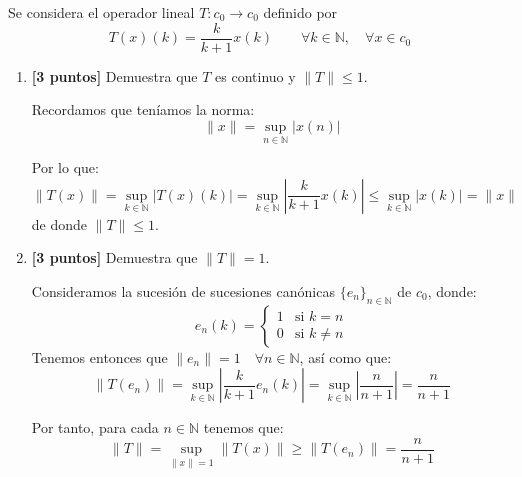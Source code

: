 \documentclass[12pt]{article}
\begin{document}
    \begin{ejercicio}[7 puntos]
        Se considera el operador lineal $T:c_0\to c_0$ definido por
        \begin{equation*}
            T(x)(k) = \frac{k}{k+1}x(k) \qquad \forall k\in \mathbb{N}, \quad \forall x\in c_0
        \end{equation*}
        \begin{enumerate}[label=\alph*)]
            \item \textbf{[3 puntos]} Demuestra que $T$ es continuo y $\|T\|\leq 1$.

                Recordamos que teníamos la norma:
                \begin{equation*}
                    \|x\| = \sup_{n\in \mathbb{N}}|x(n)|
                \end{equation*}
                
                Por lo que:
                \begin{equation*}
                    \|T(x)\| = \sup_{k\in \mathbb{N}}|T(x)(k)| = \sup_{k\in \mathbb{N}}\left|\frac{k}{k+1}x(k)\right| \leq \sup_{k\in \mathbb{N}}|x(k)| = \|x\|
                \end{equation*}
                de donde $\|T\|\leq 1$.
            \item \textbf{[3 puntos]} Demuestra que $\|T\| = 1$.
            
                Consideramos la sucesión de sucesiones canónicas $\{e_n\}_{n\in \mathbb{N}}$ de $c_0$, donde:
                \begin{equation*}
                    e_n(k) = \left\{\begin{array}{ll}
                        1 & \text{si\ } k = n \\
                        0 & \text{si\ } k \neq n
                    \end{array}\right.
                \end{equation*}
                Tenemos entonces que $\|e_n\| = 1 \quad \forall n\in \mathbb{N}$, así como que:
                \begin{equation*}
                    \|T(e_n)\| = \sup_{k\in \mathbb{N}}\left|\frac{k}{k+1}e_n(k)\right| = \sup_{k\in \mathbb{N}}\left|\frac{n}{n+1}\right| = \frac{n}{n+1}
                \end{equation*}
                
                Por tanto, para cada $n\in \mathbb{N}$ tenemos que:
                \begin{equation*}
                    \|T\| = \sup_{\|x\|=1}\|T(x)\| \geq \|T(e_n)\| = \frac{n}{n+1}
                \end{equation*}


\end{enumerate}
\end{ejercicio}
\end{document}
